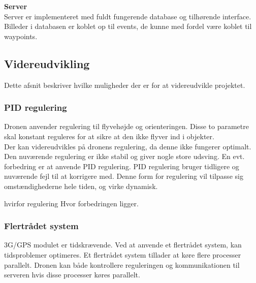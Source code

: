 \textbf{Server}\\
Server er implementeret med fuldt fungerende database og tilhørende interface. Billeder i databasen er koblet op til events, de kunne med fordel være koblet til waypoints.


\subsection{Videreudvikling}

Dette afsnit beskriver hvilke muligheder der er for at videreudvikle projektet. 

\subsubsection*{PID regulering}

Dronen anvender regulering til flyvehøjde og orienteringen. Disse to parametre skal konstant reguleres for at sikre at den ikke flyver ind i objekter. \\
Der kan videreudvikles på dronens regulering, da denne ikke fungerer optimalt. Den nuværende regulering er ikke stabil og giver nogle store udsving. En evt. forbedring er at anvende PID regulering. 
PID regulering bruger tidligere og nuværende fejl til at korrigere med. Denne form for regulering vil tilpasse sig omstændighederne hele tiden, og virke dynamisk.


hvirfor regulering
Hvor forbedringen ligger.

\subsubsection*{Flertrådet system}


3G/GPS modulet er tidskrævende. Ved at anvende et flertrådet system, kan tidsproblemer optimeres. Et flertrådet system tillader at køre flere processer parallelt.
Dronen kan både kontrollere reguleringen og kommunikationen til serveren hvis disse processer køres parallelt. 



